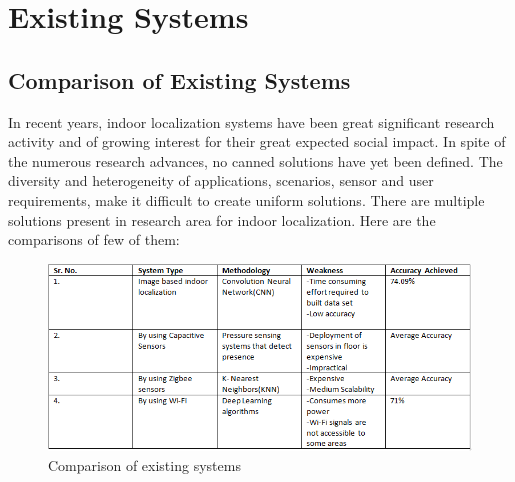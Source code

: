 \documentclass[a4paper, 12pt, oneside]{uet_thesis}
\begin{document}
\newpage
\chapter{Existing Systems}
\section{Comparison of Existing Systems}
In recent years, indoor localization systems have been great significant research activity and of growing interest for their great expected social impact. In spite of the numerous research advances, no canned solutions have yet been defined. The diversity and heterogeneity of applications, scenarios, sensor and user requirements, make it difficult to create uniform solutions. There are multiple solutions present in research area for indoor localization. Here are the comparisons of few of them: 

\begin{figure}[htbp]
\centerline{\includegraphics[scale=0.7]{abc.png}}
\caption{Comparison of existing systems}
\label{Table3}
\end{figure}
\end{document}
